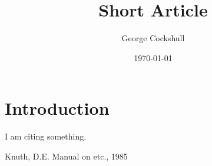\documentclass[]{article}
\title{Short Article}
\author{George Cockshull}
\date{\today}
\begin{document}
\maketitle


\section{Introduction}
I am citing something\cite{knuth}.


\begin{thebibliography}{99}
   Knuth, D.E. Manual on etc., 1985
\end{thebibliography}
\end{document}

